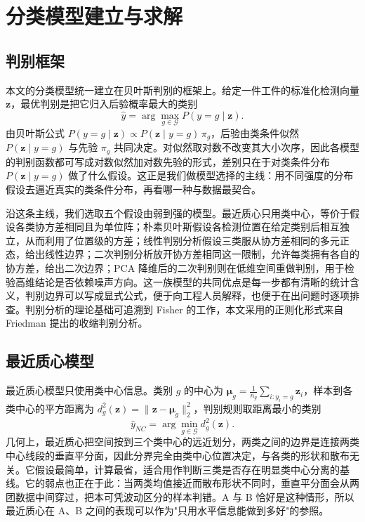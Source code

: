 \documentclass[12pt,a4paper]{article}
\newcommand{\upcite}[1]{\cite{#1}}
\begin{document}
\section{分类模型建立与求解}
\subsection{判别框架}

本文的分类模型统一建立在贝叶斯判别的框架上。给定一件工件的标准化检测向量 $\mathbf{z}$，最优判别是把它归入后验概率最大的类别
\begin{equation}
\hat{y}=\arg\max_{g\in\mathcal{G}}P(y=g\mid\mathbf{z}).
\end{equation}
由贝叶斯公式 $P(y=g\mid\mathbf{z})\propto P(\mathbf{z}\mid y=g)\,\pi_g$，后验由类条件似然 $P(\mathbf{z}\mid y=g)$ 与先验 $\pi_g$ 共同决定。对似然取对数不改变其大小次序，因此各模型的判别函数都可写成对数似然加对数先验的形式，差别只在于对类条件分布 $P(\mathbf{z}\mid y=g)$ 做了什么假设。这正是我们做模型选择的主线：用不同强度的分布假设去逼近真实的类条件分布，再看哪一种与数据最契合。

沿这条主线，我们选取五个假设由弱到强的模型。最近质心只用类中心，等价于假设各类协方差相同且为单位阵；朴素贝叶斯假设各检测位置在给定类别后相互独立，从而利用了位置级的方差；线性判别分析假设三类服从协方差相同的多元正态，给出线性边界；二次判别分析放开协方差相同这一限制，允许每类拥有各自的协方差，给出二次边界；PCA 降维后的二次判别则在低维空间重做判别，用于检验高维结论是否依赖噪声方向。这一族模型的共同优点是每一步都有清晰的统计含义，判别边界可以写成显式公式，便于向工程人员解释，也便于在出问题时逐项排查。判别分析的理论基础可追溯到 Fisher 的工作\upcite{fisher1936}，本文采用的正则化形式来自 Friedman 提出的收缩判别分析\upcite{friedman1989}。

\subsection{最近质心模型}

最近质心模型只使用类中心信息。类别 $g$ 的中心为 $\boldsymbol{\mu}_g=\frac{1}{n_g}\sum_{i:y_i=g}\mathbf{z}_i$，样本到各类中心的平方距离为 $d_g^2(\mathbf{z})=\|\mathbf{z}-\boldsymbol{\mu}_g\|_2^2$，判别规则取距离最小的类别
\begin{equation}
\hat{y}_{NC}=\arg\min_{g\in\mathcal{G}}d_g^2(\mathbf{z}).
\end{equation}
几何上，最近质心把空间按到三个类中心的远近划分，两类之间的边界是连接两类中心线段的垂直平分面，因此分界完全由类中心位置决定，与各类的形状和散布无关。它假设最简单，计算最省，适合用作判断三类是否存在明显类中心分离的基线。它的弱点也正在于此：当两类均值接近而散布形状不同时，垂直平分面会从两团数据中间穿过，把本可凭波动区分的样本判错。A 与 B 恰好是这种情形，所以最近质心在 A、B 之间的表现可以作为"只用水平信息能做到多好"的参照。
\end{document}
